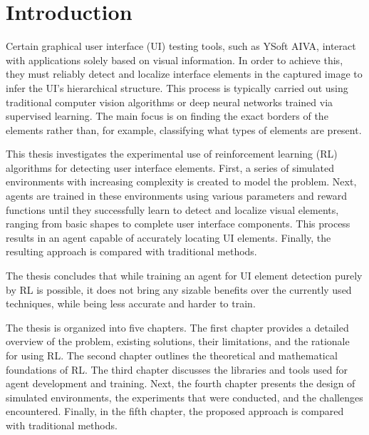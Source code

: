 \documentclass[
  digital,     %
  oneside,     %
  nosansbold,  %
  nocolorbold, %
  lof,         %
  lot,         %
]{fithesis4}
\begin{document}
\chapter*{Introduction}

Certain graphical user interface (UI) testing tools, such as YSoft AIVA, interact with applications solely based on visual information. In order to achieve this, they must reliably detect and localize interface elements in the captured image to infer the UI's hierarchical structure. This process is typically carried out using traditional computer vision algorithms or deep neural networks trained via supervised learning. The main focus is on finding the exact borders of the elements rather than, for example, classifying what types of elements are present.

This thesis investigates the experimental use of reinforcement learning (RL) algorithms for detecting user interface elements. First, a series of simulated environments with increasing complexity is created to model the problem. Next, agents are trained in these environments using various parameters and reward functions until they successfully learn to detect and localize visual elements, ranging from basic shapes to complete user interface components. This process results in an agent capable of accurately locating UI elements. Finally, the resulting approach is compared with traditional methods.

The thesis concludes that while training an agent for UI element detection purely by RL is possible, it does not bring any sizable benefits over the currently used techniques, while being less accurate and harder to train.

The thesis is organized into five chapters. The first chapter provides a detailed overview of the problem, existing solutions, their limitations, and the rationale for using RL. The second chapter outlines the theoretical and mathematical foundations of RL. The third chapter discusses the libraries and tools used for agent development and training. Next, the fourth chapter presents the design of simulated environments, the experiments that were conducted, and the challenges encountered. Finally, in the fifth chapter, the proposed approach is compared with traditional methods.
\end{document}
